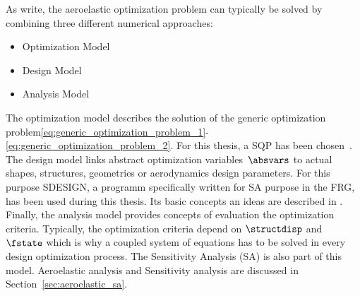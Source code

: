\documentclass[../main.tex]{subfiles}
\begin{document}
As \cite{Maute2001} write, the aeroelastic optimization problem can typically be solved by combining three different numerical approaches:
\begin{itemize}
\item Optimization Model
\item Design Model
\item Analysis Model
\end{itemize}

The optimization model describes the solution of the generic optimization problem\eqref{eq:generic_optimization_problem_1}-\eqref{eq:generic_optimization_problem_2}. For this thesis, a \ac{SQP} has been chosen~\cite{Bonnans2006}.\\
The design model links abstract optimization variables~$\absvars$ to actual shapes, structures, geometries or aerodynamics design parameters. For this purpose SDESIGN, a programm specifically written for \ac{SA} purpose in the \ac{FRG}, has been used during this thesis. Its basic concepts an ideas are described in \cite{Maute2003}.\\
Finally, the analysis model provides concepts of evaluation the optimization criteria. Typically, the optimization criteria depend on $\structdisp$ and $\fstate$ which is why a coupled system of equations has to be solved in every design optimization process. The Sensitivity Analysis (SA) is also part of this model. Aeroelastic analysis and Sensitivity analysis are discussed in Section~\ref{sec:aeroelastic_sa}.
\end{document}
